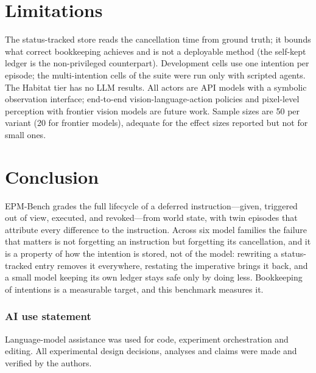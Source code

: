 \documentclass{article}
\newcommand{\bench}{EPM-Bench}
\begin{document}
\section{Limitations}

The status-tracked store reads the cancellation time from ground truth; it
bounds what correct bookkeeping achieves and is not a deployable method (the
self-kept ledger is the non-privileged counterpart). Development cells use one
intention per episode; the multi-intention cells of the suite were run only
with scripted agents. The Habitat tier has no LLM results. All actors are API
models with a symbolic observation interface; end-to-end vision-language-action
policies and pixel-level perception with frontier vision models are future work.
Sample sizes are 50 per variant (20 for frontier models), adequate for the
effect sizes reported but not for small ones.

\section{Conclusion}

\bench{} grades the full lifecycle of a deferred instruction---given, triggered
out of view, executed, and revoked---from world state, with twin episodes that
attribute every difference to the instruction. Across six model families the
failure that matters is not forgetting an instruction but forgetting its
cancellation, and it is a property of how the intention is stored, not of the
model: rewriting a status-tracked entry removes it everywhere, restating the
imperative brings it back, and a small model keeping its own ledger stays safe
only by doing less. Bookkeeping of intentions is a measurable target, and this
benchmark measures it.

\subsubsection*{AI use statement}
Language-model assistance was used for code, experiment orchestration and
editing. All experimental design decisions, analyses and claims were made and
verified by the authors.



\end{document}
